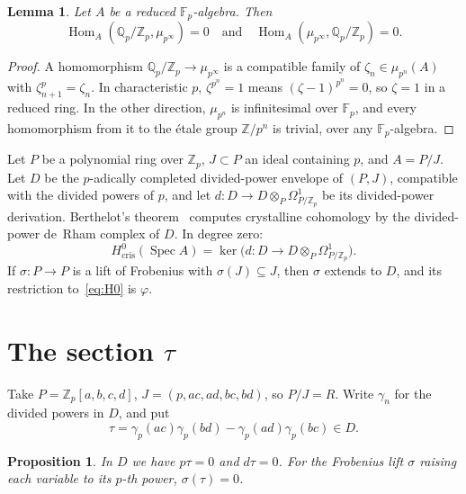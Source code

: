 \documentclass[11pt]{amsart}
\newtheorem{proposition}[theorem]{Proposition}
\newtheorem{lemma}[theorem]{Lemma}
\theoremstyle{remark}
\newcommand{\Fp}{\mathbb{F}_p}
\newcommand{\Zp}{\mathbb{Z}_p}
\newcommand{\Qp}{\mathbb{Q}_p}
\newcommand{\cris}{\mathrm{cris}}
\newcommand{\Hom}{\operatorname{Hom}}
\newcommand{\Spec}{\operatorname{Spec}}
\newcommand{\mup}{\mu_{p^\infty}}
\newcommand{\QZ}{\Qp/\Zp}
\begin{document}
\begin{lemma}\label{lem:groups}
Let $A$ be a reduced $\Fp$-algebra. Then
\[\Hom_A(\QZ,\mup)=0\quad\text{and}\quad\Hom_A(\mup,\QZ)=0.\]
\end{lemma}

\begin{proof}
A homomorphism $\QZ\to\mup$ is a compatible family of $\zeta_n\in\mu_{p^n}(A)$ with $\zeta_{n+1}^p=\zeta_n$. In
characteristic $p$, $\zeta^{p^n}=1$ means $(\zeta-1)^{p^n}=0$, so $\zeta=1$ in a reduced ring. In the other direction,
$\mu_{p^n}$ is infinitesimal over $\Fp$, and every homomorphism from it to the \'etale group $\mathbb Z/p^n$ is
trivial, over any $\Fp$-algebra.
\end{proof}

Let $P$ be a polynomial ring over $\Zp$, $J\subset P$ an ideal containing $p$, and $A=P/J$. Let $D$ be the $p$-adically
completed divided-power envelope of $(P,J)$, compatible with the divided powers of $p$, and let $d\colon D\to
D\otimes_P\Omega^1_{P/\Zp}$ be its divided-power derivation. Berthelot's theorem~\cite[Prop.~07LG]{Stacks} computes
crystalline cohomology by the divided-power de~Rham complex of $D$. In degree zero:
\begin{equation}\label{eq:H0}
H^0_\cris(\Spec A)=\ker\bigl(d\colon D\to D\otimes_P\Omega^1_{P/\Zp}\bigr).
\end{equation}
If $\sigma\colon P\to P$ is a lift of Frobenius with $\sigma(J)\subseteq J$, then $\sigma$ extends to $D$, and its
restriction to~\eqref{eq:H0} is $\varphi$.

\section{The section \texorpdfstring{$\tau$}{tau}}

Take $P=\Zp[a,b,c,d]$, $J=(p,ac,ad,bc,bd)$, so $P/J=R$. Write $\gamma_n$ for the divided powers in $D$, and put
\[
\tau=\gamma_p(ac)\gamma_p(bd)-\gamma_p(ad)\gamma_p(bc)\in D.
\]

\begin{proposition}\label{prop:tau}
In $D$ we have $p\tau=0$ and $d\tau=0$. For the Frobenius lift $\sigma$ raising each variable to its $p$-th power,
$\sigma(\tau)=0$.
\end{proposition}
\end{document}
